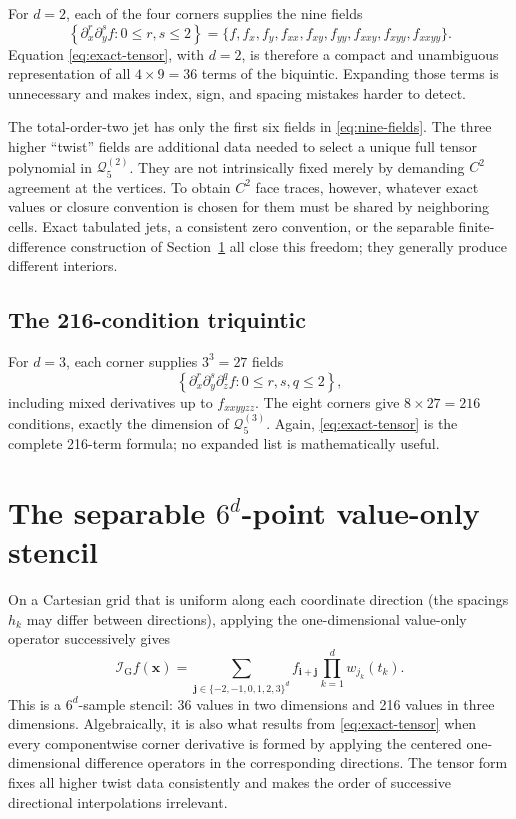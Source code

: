 \documentclass[11pt]{article}
\newcommand{\Q}{\mathcal{Q}}
\newcommand{\I}{\mathcal{I}}
\newcommand{\bj}{\boldsymbol{j}}
\newcommand{\bi}{\boldsymbol{i}}
\newcommand{\bx}{\boldsymbol{x}}
\begin{document}
For $d=2$, each of the four corners supplies the nine fields
\begin{equation}
  \left\{\partial_x^r\partial_y^s f:0\leq r,s\leq2\right\}
  =\{f,f_x,f_y,f_{xx},f_{xy},f_{yy},
      f_{xxy},f_{xyy},f_{xxyy}\}.
  \label{eq:nine-fields}
\end{equation}
Equation \eqref{eq:exact-tensor}, with $d=2$, is therefore a compact and
unambiguous representation of all $4\times9=36$ terms of the biquintic.
Expanding those terms is unnecessary and makes index, sign, and spacing
mistakes harder to detect.

The total-order-two jet has only the first six fields in
\eqref{eq:nine-fields}.  The three higher ``twist'' fields are additional
data needed to select a unique full tensor polynomial in \(\Q_5^{(2)}\).
They are not intrinsically fixed merely by demanding $C^2$ agreement at the
vertices.  To obtain $C^2$ face traces, however, whatever exact values or
closure convention is chosen for them must be shared by neighboring cells.
Exact tabulated jets, a consistent zero convention, or the separable
finite-difference construction of Section~\ref{sec:grid-tensor} all close this
freedom; they generally produce different interiors.

\subsection{The 216-condition triquintic}

For $d=3$, each corner supplies $3^3=27$ fields
\begin{equation}
  \left\{\partial_x^r\partial_y^s\partial_z^q f:
  0\leq r,s,q\leq2\right\},
  \label{eq:27-fields}
\end{equation}
including mixed derivatives up to $f_{xxyyzz}$.  The eight corners give
$8\times27=216$ conditions, exactly the dimension of \(\Q_5^{(3)}\).
Again, \eqref{eq:exact-tensor} is the complete 216-term formula; no expanded
list is mathematically useful.

\section{The separable \texorpdfstring{$6^d$}{6d}-point value-only stencil}
\label{sec:grid-tensor}

On a Cartesian grid that is uniform along each coordinate direction (the
spacings $h_k$ may differ between directions), applying the one-dimensional
value-only operator successively gives
\begin{equation}
  \boxed{
  \I_{\mathrm G}f(\bx)=
  \sum_{\bj\in\{-2,-1,0,1,2,3\}^d}
  f_{\bi+\bj}\prod_{k=1}^d w_{j_k}(t_k).}
  \label{eq:grid-tensor}
\end{equation}
This is a $6^d$-sample stencil: 36 values in two dimensions and 216 values
in three dimensions.  Algebraically, it is also what results from
\eqref{eq:exact-tensor} when every componentwise corner derivative is formed
by applying the centered one-dimensional difference operators in the
corresponding directions.  The tensor form fixes all higher twist data
consistently and makes the order of successive directional interpolations
irrelevant.
\end{document}
